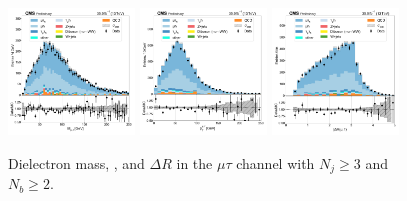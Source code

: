\begin{figure}[htb!]
    \centering
    \includegraphics[width=0.3\textwidth]{chapters/Analysis/sectionPlots/figures/data_mc_overlays/mutau_2016_cat_gt3_gt2_signal_linear_lepton_dilepton1_mass}
    \includegraphics[width=0.3\textwidth]{chapters/Analysis/sectionPlots/figures/data_mc_overlays/mutau_2016_cat_gt3_gt2_signal_linear_lepton_dilepton1_pt}
    \includegraphics[width=0.3\textwidth]{chapters/Analysis/sectionPlots/figures/data_mc_overlays/mutau_2016_cat_gt3_gt2_signal_linear_lepton_dilepton1_delta_r}
    \caption{Dielectron mass, \pt, and $\Delta R$ in the $\mu\tau$ channel
    with $N_{j} \geq 3$ and $N_{b} \geq 2$.}
    \label{fig:analysis:plots:mutau_8_dilepton}
\end{figure}

